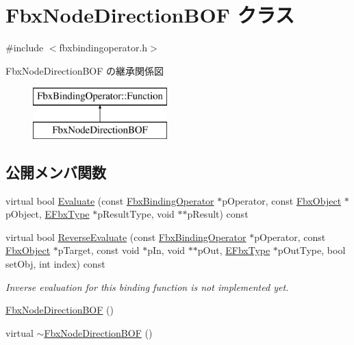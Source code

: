 \hypertarget{class_fbx_node_direction_b_o_f}{}\section{Fbx\+Node\+Direction\+B\+OF クラス}
\label{class_fbx_node_direction_b_o_f}


{\ttfamily \#include $<$fbxbindingoperator.\+h$>$}

Fbx\+Node\+Direction\+B\+OF の継承関係図\begin{figure}[H]
\begin{center}
\leavevmode
\includegraphics[height=2.000000cm]{class_fbx_node_direction_b_o_f}
\end{center}
\end{figure}
\subsection*{公開メンバ関数}
\begin{DoxyCompactItemize}
\item 
virtual bool \hyperlink{class_fbx_node_direction_b_o_f_a2366e8ea542715bd9bb4c4e865e4978c}{Evaluate} (const \hyperlink{class_fbx_binding_operator}{Fbx\+Binding\+Operator} $\ast$p\+Operator, const \hyperlink{class_fbx_object}{Fbx\+Object} $\ast$p\+Object, \hyperlink{fbxpropertytypes_8h_a73913a5ddfb20e57c6f25e9e6784bd92}{E\+Fbx\+Type} $\ast$p\+Result\+Type, void $\ast$$\ast$p\+Result) const
\item 
virtual bool \hyperlink{class_fbx_node_direction_b_o_f_ae550509066a010d97d92777df2cba41e}{Reverse\+Evaluate} (const \hyperlink{class_fbx_binding_operator}{Fbx\+Binding\+Operator} $\ast$p\+Operator, const \hyperlink{class_fbx_object}{Fbx\+Object} $\ast$p\+Target, const void $\ast$p\+In, void $\ast$$\ast$p\+Out, \hyperlink{fbxpropertytypes_8h_a73913a5ddfb20e57c6f25e9e6784bd92}{E\+Fbx\+Type} $\ast$p\+Out\+Type, bool set\+Obj, int index) const
\begin{DoxyCompactList}\small\item\em Inverse evaluation for this binding function is not implemented yet. \end{DoxyCompactList}\item 
\hyperlink{class_fbx_node_direction_b_o_f_a8e7616976dab63af690ea44d96f10813}{Fbx\+Node\+Direction\+B\+OF} ()
\item 
virtual \hyperlink{class_fbx_node_direction_b_o_f_a68e309ed65613ce119511f57fcc9ac91}{$\sim$\+Fbx\+Node\+Direction\+B\+OF} ()
\end{DoxyCompactItemize}

